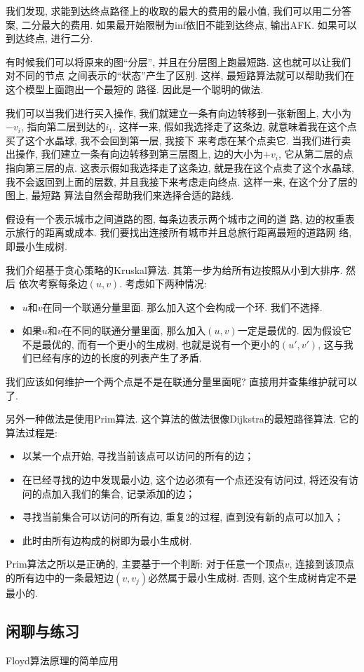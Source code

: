  我们发现, 求能到达终点路径上的收取的最大的费用的最小值, 
我们可以用二分答案, 二分最大的费用. 如果最开始限制为inf依旧不能到达终点, 输出AFK. 
如果可以到达终点, 进行二分.

有时候我们可以将原来的图``分层'', 并且在分层图上跑最短路. 这也就可以让我们对不同的节点
之间表示的``状态''产生了区别. 这样, 最短路算法就可以帮助我们在这个模型上面跑出一个最短的
路径. 因此是一个聪明的做法. 

 我们可以当我们进行买入操作, 我们就建立一条有向边转移到一张新图上, 
大小为$-v_i$, 指向第二层到达的$i_1$. 
这样一来, 假如我选择走了这条边, 就意味着我在这个点买了这个水晶球, 我不会回到第一层, 我接下
来考虑在某个点卖它. 当我们进行卖出操作, 我们建立一条有向边转移到第三层图上, 边的大小为$+v_i$,
它从第二层的点指向第三层的点. 这表示假如我选择走了这条边, 就是我在这个点卖了这个水晶球, 
我不会返回到上面的层数, 并且我接下来考虑走向终点. 这样一来, 在这个分了层的图上, 最短路
算法自然会帮助我们来选择合适的路线. 


 假设有一个表示城市之间道路的图, 每条边表示两个城市之间的道
路, 边的权重表示旅行的距离或成本. 我们要找出连接所有城市并且总旅行距离最短的道路网
络, 即最小生成树. 

我们介绍基于贪心策略的Kruskal算法. 其第一步为给所有边按照从小到大排序. 然后 
依次考察每条边$(u,v)$. 考虑如下两种情况: 
\begin{itemize}[noitemsep]
    \item $u$和$v$在同一个联通分量里面. 那么加入这个会构成一个环. 我们不选择. 
    \item 如果$u$和$v$在不同的联通分量里面, 那么加入$(u,v)$一定是最优的. 因为假设它不是最优的, 而有一个更小的生成树, 也就是说有一个更小的$(u',v')$, 这与我们已经有序的边的长度的列表产生了矛盾. 
\end{itemize}

我们应该如何维护一个两个点是不是在联通分量里面呢? 直接用并查集维护就可以了. 

另外一种做法是使用Prim算法. 这个算法的做法很像Dijkstra的最短路径算法. 
它的算法过程是: 
\begin{itemize}[noitemsep]
    \item 以某一个点开始, 寻找当前该点可以访问的所有的边；
    \item 在已经寻找的边中发现最小边, 这个边必须有一个点还没有访问过, 将还没有访问的点加入我们的集合, 记录添加的边；
    \item 寻找当前集合可以访问的所有边, 重复2的过程, 直到没有新的点可以加入；
    \item 此时由所有边构成的树即为最小生成树. 
\end{itemize}

Prim算法之所以是正确的, 主要基于一个判断: 对于任意一个顶点$v$, 连接到该顶点的所有边中的一条最短边$(v, v_j)$必然属于最小生成树. 否则, 这个生成树肯定不是最小的. 

\subsection*{闲聊与练习}

\begin{exercise}{Floyd算法原理的简单应用}
    
\end{exercise}